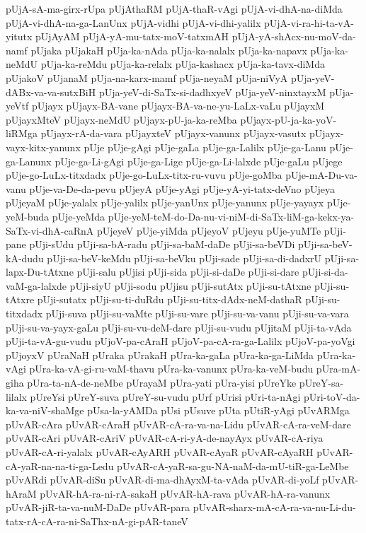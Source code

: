 {pUjA-sA-ma-girx-rUpa
pUjAthaRM
pUjA-thaR-vAgi
pUjA-vi-dhA-na-diMda
pUjA-vi-dhA-na-ga-LanUnx
pUjA-vidhi
pUjA-vi-dhi-yalilx
pUjA-vi-ra-hi-ta-vA-yitutx
pUjAyAM
pUjA-yA-mu-tatx-moV-tatxmAH
pUjA-yA-shAcx-nu-moV-da-namf
pUjaka
pUjakaH
pUja-ka-nAda
pUja-ka-nalalx
pUja-ka-napavx
pUja-ka-neMdU
pUja-ka-reMdu
pUja-ka-relalx
pUja-kashacx
pUja-ka-tavx-diMda
pUjakoV
pUjanaM
pUja-na-karx-mamf
pUja-neyaM
pUja-niVyA
pUja-yeV-dABx-va-va-sutxBiH
pUja-yeV-di-SaTx-si-dadhxyeV
pUja-yeV-ninxtayxM
pUja-yeVtf
pUjayx
pUjayx-BA-vane
pUjayx-BA-va-ne-yu-LaLx-vaLu
pUjayxM
pUjayxMteV
pUjayx-neMdU
pUjayx-pU-ja-ka-reMba
pUjayx-pU-ja-ka-yoV-liRMga
pUjayx-rA-da-vara
pUjayxteV
pUjayx-vanunx
pUjayx-vasutx
pUjayx-vayx-kitx-yanunx
pUje
pUje-gAgi
pUje-gaLa
pUje-ga-Lalilx
pUje-ga-Lanu
pUje-ga-Lanunx
pUje-ga-Li-gAgi
pUje-ga-Lige
pUje-ga-Li-lalxde
pUje-gaLu
pUjege
pUje-go-LuLx-titxdadx
pUje-go-LuLx-titx-ru-vuvu
pUje-goMba
pUje-mA-Du-va-vanu
pUje-va-De-da-pevu
pUjeyA
pUje-yAgi
pUje-yA-yi-tatx-deVno
pUjeya
pUjeyaM
pUje-yalalx
pUje-yalilx
pUje-yanUnx
pUje-yanunx
pUje-yayayx
pUje-yeM-buda
pUje-yeMda
pUje-yeM-teM-do-Da-nu-vi-niM-di-SaTx-liM-ga-kekx-ya-SaTx-vi-dhA-caRnA
pUjeyeV
pUje-yiMda
pUjeyoV
pUjeyu
pUje-yuMTe
pUji-pane
pUji-sUdu
pUji-sa-bA-radu
pUji-sa-baM-daDe
pUji-sa-beVDi
pUji-sa-beV-kA-dudu
pUji-sa-beV-keMdu
pUji-sa-beVku
pUji-sade
pUji-sa-di-dadxrU
pUji-sa-lapx-Du-tAtxne
pUji-salu
pUjisi
pUji-sida
pUji-si-daDe
pUji-si-dare
pUji-si-da-vaM-ga-lalxde
pUji-siyU
pUji-sodu
pUjisu
pUji-sutAtx
pUji-su-tAtxne
pUji-su-tAtxre
pUji-sutatx
pUji-su-ti-duRdu
pUji-su-titx-dAdx-neM-dathaR
pUji-su-titxdadx
pUji-suva
pUji-su-vaMte
pUji-su-vare
pUji-su-va-vanu
pUji-su-va-vara
pUji-su-va-yayx-gaLu
pUji-su-vu-deM-dare
pUji-su-vudu
pUjitaM
pUji-ta-vAda
pUji-ta-vA-gu-vudu
pUjoV-pa-cAraH
pUjoV-pa-cA-ra-ga-Lalilx
pUjoV-pa-yoVgi
pUjoyxV
pUraNaH
pUraka
pUrakaH
pUra-ka-gaLa
pUra-ka-ga-LiMda
pUra-ka-vAgi
pUra-ka-vA-gi-ru-vaM-thavu
pUra-ka-vanunx
pUra-ka-veM-budu
pUra-mA-giha
pUra-ta-nA-de-neMbe
pUrayaM
pUra-yati
pUra-yisi
pUreYke
pUreY-sa-lilalx
pUreYsi
pUreY-suva
pUreY-su-vudu
pUrf
pUrisi
pUri-ta-nAgi
pUri-toV-da-ka-va-niV-shaMge
pUsa-la-yAMDa
pUsi
pUsuve
pUta
pUtiR-yAgi
pUvARMga
pUvAR-cAra
pUvAR-cAraH
pUvAR-cA-ra-va-na-Lidu
pUvAR-cA-ra-veM-dare
pUvAR-cAri
pUvAR-cAriV
pUvAR-cA-ri-yA-de-nayAyx
pUvAR-cA-riya
pUvAR-cA-ri-yalalx
pUvAR-cAyARH
pUvAR-cAyaR
pUvAR-cAyaRH
pUvAR-cA-yaR-na-na-ti-ga-Ledu
pUvAR-cA-yaR-sa-gu-NA-naM-da-mU-tiR-ga-LeMbe
pUvARdi
pUvAR-diSu
pUvAR-di-ma-dhAyxM-ta-vAda
pUvAR-di-yoLf
pUvAR-hAraM
pUvAR-hA-ra-ni-rA-sakaH
pUvAR-hA-rava
pUvAR-hA-ra-vanunx
pUvAR-jiR-ta-va-nuM-DaDe
pUvAR-para
pUvAR-sharx-mA-cA-ra-va-nu-Li-du-tatx-rA-cA-ra-ni-SaThx-nA-gi-pAR-taneV
}
